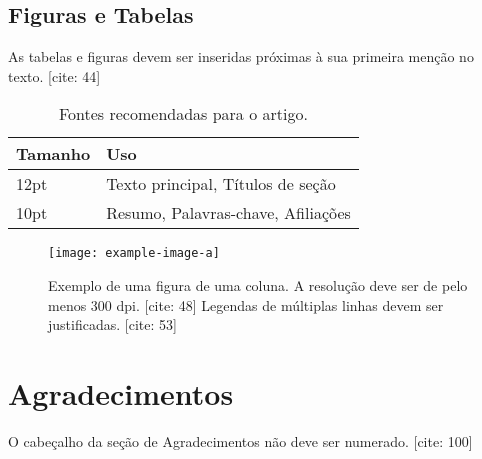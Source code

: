 \documentclass{siintec}
\begin{document}
\subsection{Figuras e Tabelas}
As tabelas e figuras devem ser inseridas próximas à sua primeira menção no texto. [cite: 44]

\begin{table}[h]
\caption{Fontes recomendadas para o artigo.} %
\label{tab:fonts}
\centering
\begin{tabular}{ll}
\hline
\textbf{Tamanho} & \textbf{Uso} \\
\hline
12pt & Texto principal, Títulos de seção \\ %
10pt & Resumo, Palavras-chave, Afiliações \\ %
\hline
\end{tabular}
\end{table}

\begin{figure}[h]
\centering
\texttt{[image: example-image-a]} %
\caption{Exemplo de uma figura de uma coluna. A resolução deve ser de pelo menos 300 dpi. [cite: 48] Legendas de múltiplas linhas devem ser justificadas. [cite: 53]}
\label{fig:exemplo}
\end{figure}

\lipsum[3-4]

\section*{Agradecimentos}
O cabeçalho da seção de Agradecimentos não deve ser numerado. [cite: 100]
\end{document}
